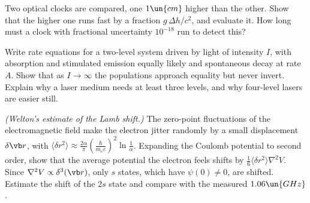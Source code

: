 \begin{problems}
\core Two optical clocks are compared, one $1\un{cm}$ higher than the other. Show that the higher one runs fast by a fraction $g\,\Delta h/c^2$, and evaluate it. How long must a clock with fractional uncertainty $10^{-18}$ run to detect this?

\core \label{prob:two-level} Write rate equations for a two-level system driven by light of intensity $I$, with absorption and stimulated emission equally likely and spontaneous decay at rate $A$. Show that as $I\to\infty$ the populations approach equality but never invert. Explain why a laser medium needs at least three levels, and why four-level lasers are easier still.

 \label{prob:welton} \emph{(Welton's estimate of the Lamb shift.)} The zero-point fluctuations of the electromagnetic field make the electron jitter randomly by a small displacement $\delta\vb r$, with $\langle\delta r^2\rangle\approx\frac{2\alpha}{\pi}\left(\frac{\hbar}{m_ec}\right)^2\ln\frac{1}{\alpha}$. Expanding the Coulomb potential to second order, show that the average potential the electron feels shifts by $\tfrac16\langle\delta r^2\rangle\nabla^2V$. Since $\nabla^2V\propto\delta^3(\vb r)$, only $s$ states, which have $\psi(0)\neq0$, are shifted. Estimate the shift of the $2s$ state and compare with the measured $1.06\un{GHz}$.
\end{problems}

\begin{reading}
\end{reading}
